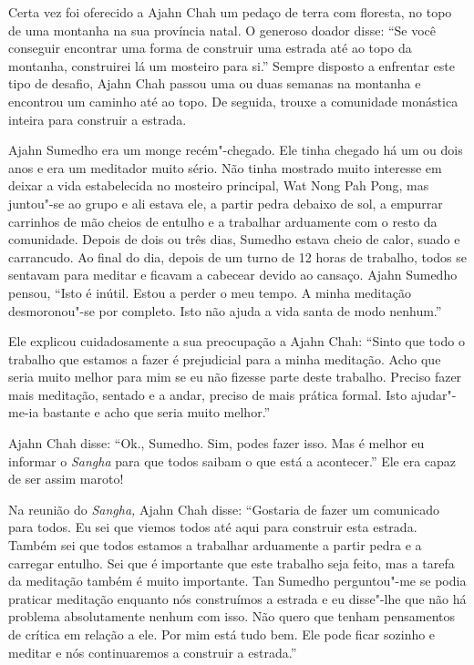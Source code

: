 Certa vez foi oferecido a Ajahn Chah um pedaço de terra com floresta, no
topo de uma montanha na sua província natal. O generoso doador disse:
``Se você conseguir encontrar uma forma de construir uma estrada até ao
topo da montanha, construirei lá um mosteiro para si.'' Sempre disposto
a enfrentar este tipo de desafio, Ajahn Chah passou uma ou duas semanas
na montanha e encontrou um caminho até ao topo. De seguida, trouxe a
comunidade monástica inteira para construir a estrada.  

Ajahn Sumedho era um monge recém"-chegado. Ele tinha chegado há um ou
dois anos e era um meditador muito sério. Não tinha mostrado muito
interesse em deixar a vida estabelecida no mosteiro principal, Wat Nong
Pah Pong, mas juntou"-se ao grupo e ali estava ele, a partir pedra
debaixo de sol, a empurrar carrinhos de mão cheios de entulho e a
trabalhar arduamente com o resto da comunidade. Depois de dois ou três
dias, Sumedho estava cheio de calor, suado e carrancudo. Ao final do
dia, depois de um turno de 12 horas de trabalho, todos se sentavam para
meditar e ficavam a cabecear devido ao cansaço. Ajahn Sumedho pensou,
``Isto é inútil. Estou a perder o meu tempo. A minha meditação
desmoronou"-se por completo. Isto não ajuda a vida santa de modo
nenhum.''

Ele explicou cuidadosamente a sua preocupação a Ajahn Chah: ``Sinto que
todo o trabalho que estamos a fazer é prejudicial para a minha
meditação. Acho que seria muito melhor para mim se eu não fizesse parte
deste trabalho. Preciso fazer mais meditação, sentado e a andar, preciso
de mais prática formal. Isto ajudar"-me-ia bastante e acho que seria
muito melhor.''

Ajahn Chah disse: ``Ok., Sumedho. Sim, podes fazer isso. Mas é melhor eu
informar o \emph{Sangha} para que todos saibam o que está a acontecer.''
Ele era capaz de ser assim maroto!

Na reunião do \emph{Sangha,} Ajahn Chah disse: ``Gostaria de fazer um
comunicado para todos. Eu sei que viemos todos até aqui para construir
esta estrada. Também sei que todos estamos a trabalhar arduamente a
partir pedra e a carregar entulho. Sei que é importante que este
trabalho seja feito, mas a tarefa da meditação também é muito
importante. Tan Sumedho perguntou"-me se podia praticar meditação
enquanto nós construímos a estrada e eu disse"-lhe que não há problema
absolutamente nenhum com isso. Não quero que tenham pensamentos de
crítica em relação a ele. Por mim está tudo bem. Ele pode ficar sozinho
e meditar e nós continuaremos a construir a estrada.''

